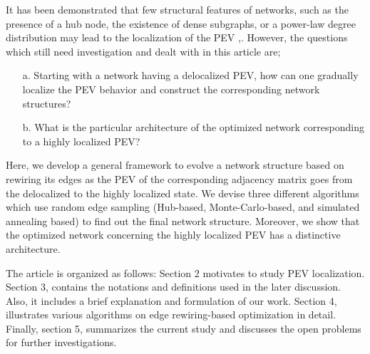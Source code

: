 \documentclass[envcountreset,oribibl]{llncs}
\begin{document}
It has been demonstrated that few structural features of networks, such as the presence of a hub node, the existence of dense subgraphs, or a power-law degree distribution may lead to the localization of the PEV \cite{MZN2014},\cite{Goltsev_prl2012}. However, the questions which still need investigation and dealt with in this article are; 
\begin{itemize}
\item[a.] Starting with a network having a delocalized PEV, how can one gradually localize the PEV behavior and construct the corresponding network structures?
\item[b.] What is the particular architecture of the optimized network corresponding to a highly localized PEV?
\end{itemize}
Here, we develop a general framework to evolve a  network structure based on rewiring its edges as the PEV of the corresponding adjacency matrix goes from the delocalized to the highly localized state. We devise three different algorithms which use random edge sampling (Hub-based, Monte-Carlo-based, and simulated annealing based) to find out the final network structure. Moreover, we show that the optimized network concerning the highly localized PEV has a distinctive architecture.

The article is organized as follows: Section 2 motivates to study PEV localization. Section 3, contains the notations and definitions used in the later discussion. Also, it includes a brief explanation and formulation of our work. Section 4, illustrates various algorithms on edge rewiring-based optimization in detail. Finally, section 5, summarizes the current study and discusses the open problems for further investigations.
\end{document}
